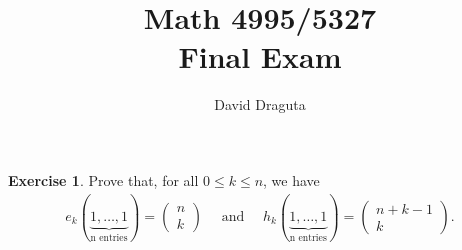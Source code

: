 \documentclass[8pt]{extarticle}
\title{ Math 4995/5327
  \\
  Final Exam}
\author{David Draguta}
\newcommand{\<}{\langle}
\renewcommand{\>}{\rangle}
\theoremstyle{definition}
\newtheorem{exercise}{Exercise}
\begin{document}
\maketitle

\begin{exercise}
  Prove that, for all $0 \leq k \leq n$, we have
  \begin{align*}
    e_k(\underbrace{1,\dots, 1}_{\text{n entries}}) = 
    \begin{pmatrix}
      n \\
      k
    \end{pmatrix}
    \quad \text{ and } \quad
    h_k(\underbrace{1,\dots, 1}_{\text{n entries}}) = 
    \begin{pmatrix}
      n + k - 1 \\
      k
    \end{pmatrix}.  
  \end{align*}

\end{exercise}
\end{document}
